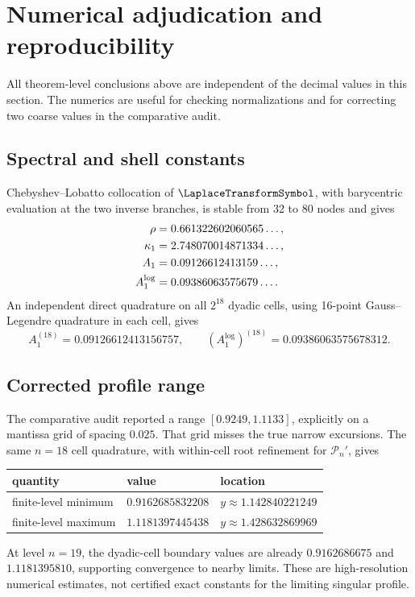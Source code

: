 \documentclass[11pt,oneside]{article}
\theoremstyle{definition}
\theoremstyle{remark}
\begin{document}
\section{Numerical adjudication and reproducibility}
\label{sec:numerics}

All theorem-level conclusions above are independent of the decimal values in
this section.  The numerics are useful for checking normalizations and for
correcting two coarse values in the comparative audit.

\subsection{Spectral and shell constants}

Chebyshev--Lobatto collocation of \(\LaplaceTransformSymbol\), with barycentric evaluation at the
two inverse branches, is stable from 32 to 80 nodes and gives
\begin{align}
 \rho&=0.661322602060565\ldots,\notag\\
 \kappa_1&=2.748070014871334\ldots,\notag\\
 A_1&=0.09126612413159\ldots,\notag\\
 A_1^{\log}&=0.09386063575679\ldots .
 \label{eq:numeric-constants}
\end{align}
An independent direct quadrature on all \(2^{18}\) dyadic cells, using
16-point Gauss--Legendre quadrature in each cell, gives
\[
 A_1^{(18)}=0.09126612413156757,
 \qquad
 (A_1^{\log})^{(18)}=0.09386063575678312.
\]

\subsection{Corrected profile range}

The comparative audit reported a range \([0.9249,1.1133]\), explicitly on a
mantissa grid of spacing \(0.025\).  That grid misses the true narrow
excursions.  The same \(n=18\) cell quadrature, with within-cell root refinement
for \(\mathscr P_n'\), gives
\begin{center}
\begin{tabular}{@{}lll@{}}
\toprule
quantity & value & location\\
\midrule
finite-level minimum
 & \(0.9162685832208\)
 & \(y\approx1.142840221249\)\\
finite-level maximum
 & \(1.1181397445438\)
 & \(y\approx1.428632869969\)\\
\bottomrule
\end{tabular}
\end{center}
At level \(n=19\), the dyadic-cell boundary values are already
\(0.9162686675\) and \(1.1181395810\), supporting convergence to nearby
limits.  These are high-resolution numerical estimates, not certified exact
constants for the limiting singular profile.
\end{document}
